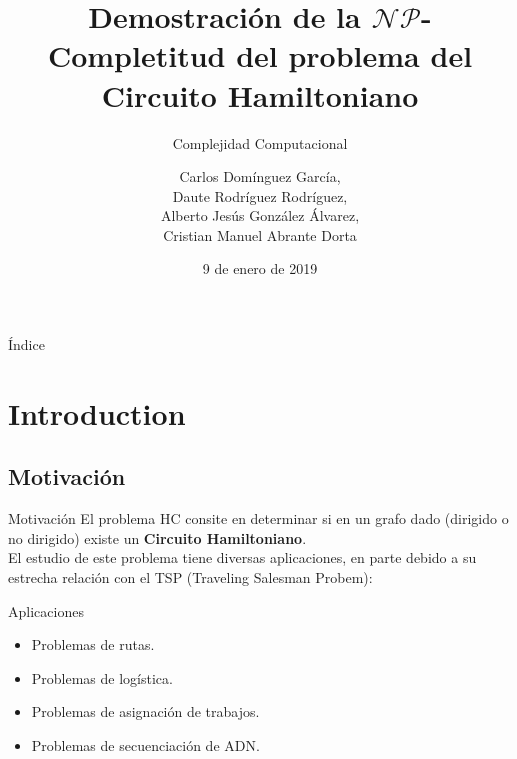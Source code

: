 \documentclass{beamer}
\title[HC $\mathcal{NP}$-Completitud]{Demostración de la $\mathcal{NP}$-Completitud del problema del Circuito Hamiltoniano}
\subtitle{Complejidad Computacional}
\author[C.D.G., D.R.R., A.G.A., C.A.D.]{
    Carlos Domínguez García,\\
    Daute Rodríguez Rodríguez,\\
    Alberto Jesús González Álvarez,\\
    Cristian Manuel Abrante Dorta
}
\institute[ULL]{Universidad de La Laguna}
\date{9 de enero de 2019}
\begin{document}
\begin{frame}
    \titlepage
\end{frame}

\begin{frame}{Índice}
    \tableofcontents
\end{frame}

\section{Introduction}
\subsection{Motivación}
\begin{frame}{Motivación}
    El problema HC consite en determinar si en un grafo dado (dirigido o no dirigido) existe un \textbf{Circuito Hamiltoniano}. \\
    \vfill
    El estudio de este problema tiene diversas aplicaciones, en parte debido a su estrecha relación con el TSP (Traveling Salesman Probem):
    \begin{block}{Aplicaciones}
        \begin{itemize}
            \item Problemas de rutas.
            \item Problemas de logística.
            \item Problemas de asignación de trabajos.
            \item Problemas de secuenciación de ADN.
        \end{itemize}
    \end{block}
\end{frame}
\end{document}
